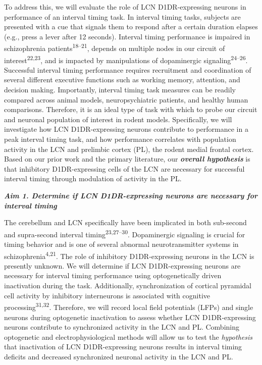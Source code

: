 \documentclass[]{article}
\begin{document}
To address this, we will evaluate the role of LCN D1DR-expressing
neurons in performance of an interval timing task. In interval timing
tasks, subjects are presented with a cue that signals them to respond
after a certain duration elapses (e.g., press a lever after 12 seconds).
Interval timing performance is impaired in schizophrenia
patients\textsuperscript{18--21}, depends on multiple nodes in our
circuit of interest\textsuperscript{22,23}, and is impacted by
manipulations of dopaminergic signaling\textsuperscript{24--26}.
Successful interval timing performance requires recruitment and
coordination of several different executive functions such as working
memory, attention, and decision making. Importantly, interval timing
task measures can be readily compared across animal models,
neuropsychiatric patients, and healthy human comparisons. Therefore, it
is an ideal type of task with which to probe our circuit and neuronal
population of interest in rodent models. Specifically, we will
investigate how LCN D1DR-expressing neurons contribute to performance in
a peak interval timing task, and how performance correlates with
population activity in the LCN and prelimbic cortex (PL), the rodent
medial frontal cortex. Based on our prior work and the primary
literature, our \textbf{\emph{overall hypothesis}} is that inhibitory
D1DR-expressing cells of the LCN are necessary for successful interval
timing through modulation of activity in the PL.

\textbf{\emph{Aim 1. Determine if LCN D1DR-expressing neurons are
necessary for interval timing}}

The cerebellum and LCN specifically have been implicated in both
sub-second and supra-second interval timing\textsuperscript{23,27--30}.
Dopaminergic signaling is crucial for timing behavior and is one of
several abnormal neurotransmitter systems in
schizophrenia\textsuperscript{4,21}. The role of inhibitory
D1DR-expressing neurons in the LCN is presently unknown. We will
determine if LCN D1DR-expressing neurons are necessary for interval
timing performance using optogenetically driven inactivation during the
task. Additionally, synchronization of cortical pyramidal cell activity
by inhibitory interneurons is associated with cognitive
processing\textsuperscript{31,32}. Therefore, we will record local field
potentials (LFPs) and single neurons during optogenetic inactivation to
assess whether LCN D1DR-expressing neurons contribute to synchronized
activity in the LCN and PL. Combining optogenetic and
electrophysiological methods will allow us to test the \emph{hypothesis}
that inactivation of LCN D1DR-expressing neurons results in interval
timing deficits and decreased synchronized neuronal activity in the LCN
and PL.
\end{document}
